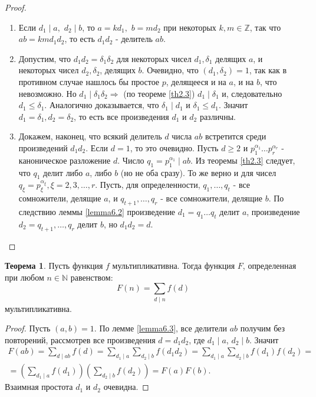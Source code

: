 \documentclass[a4paper, 12pt]{article}
\newcommand{\N}{\mathbb{N}}
\newcommand{\Z}{\mathbb{Z}}
\renewcommand{\div}{\mid}
\newcommand\tab[1][.5cm]{\hspace*{#1}}
\theoremstyle{definition}
\newtheorem{theorem}{Теорема}[section]
\begin{document}
    \begin{proof} \tab
        \begin{enumerate}
            \item Если $d_1 \div a,$ $d_2 \div b$, то $a=kd_1,$ $b=md_2$ при некоторых $k,m\in \Z$, так что $ab=kmd_1d_2$, то есть $d_1d_2$ - делитель $ab$.
            \item Допустим, что $d_1d_2=\delta_1\delta_2$ для некоторых чисел $d_1, \delta_1$ делящих $a$, и некоторых чисел $d_2, \delta_2$, делящих $b$. Очевидно, что $(d_1,\delta_2)=1$, так как в противном случае нашлось бы простое $p$, делящееся и на $a$, и на $b$, что невозможно. Но $d_1 \div \delta_1\delta_2 \Rightarrow$ (по теореме \ref{th2.3}) $d_1 \div \delta_1$ и, следовательно $d_1\leq \delta_1$. Аналогично доказывается, что $\delta_1\div d_1$ и $\delta_1\leq d_1$. Значит $d_1=\delta_1, d_2=\delta_2$, то есть все произведения $d_1$ и $d_2$ различны.
            \item Докажем, наконец, что всякий делитель $d$ числа $ab$ встретится среди произведений $d_1d_2$. Если $d=1$, то это очевидно. Пусть $d\geq 2$ и $p_1^{\alpha_1}\dots p_r^{\alpha_r}$ - каноническое разложение $d$. Число $q_1=p_1^{\alpha_1} \div ab$. Из теоремы \ref{th2.3} следует, что $q_1$ делит либо $a$, либо $b$ (но не оба сразу). То же верно и для чисел $q_{\xi}=p_{\xi}^{\alpha_{\xi}}, \xi=2,3,\dots,r$. Пусть, для определенности, $q_1,\dots, q_t$ - все сомножители, делящие $a$, и $q_{t+1},\dots, q_r$ - все сомножители, делящие $b$. По следствию леммы \ref{lemma6.2} произведение $d_1=q_1\dots q_t$ делит $a$, произведение $d_2=q_{t+1},\dots, q_r$ делит $b$, но $d_1d_2=d$.
        \end{enumerate}
    \end{proof}
    \begin{theorem} \label{th6.2}
        Пусть функция $f$ мультипликативна. Тогда функция $F$, определенная при любом $n\in \N$ равенством:
        $$F(n)=\sum\limits_{d\div n}f(d)$$
        мультипликативна.
    \end{theorem}
    \begin{proof}
        Пусть $(a,b)=1$. По лемме \ref{lemma6.3}, все делители $ab$ получим без повторений, рассмотрев все произведения $d=d_1d_2$, где $d_1 \div a$, $d_2 \div b$. Значит
        \begin{multline*}
        F(ab)=\sum\limits_{d\div ab}f(d)=\sum\limits_{d_1 \div a}\sum\limits_{d_2 \div b}f(d_1d_2)=\sum\limits_{d_1 \div a}\sum\limits_{d_2 \div b}f(d_1)f(d_2)=\\
        =(\sum\limits_{d_1 \div a}f(d_1))(\sum\limits_{d_2 \div b}f(d_2))=F(a)F(b).
        \end{multline*}
        Взаимная простота $d_1$ и $d_2$ очевидна.
    \end{proof} 
\end{document}
